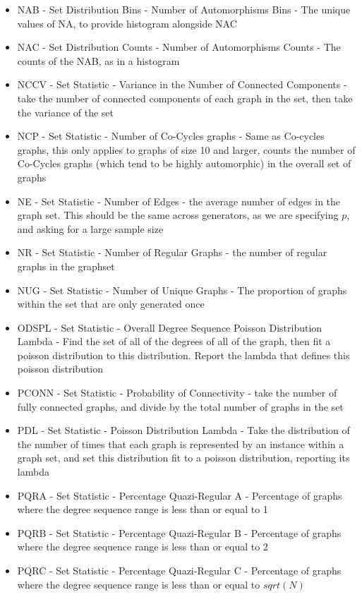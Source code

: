 \begin{itemize}
\item{NAB - Set Distribution Bins - Number of Automorphisms Bins - The unique values of NA, to provide histogram alongside NAC}
\item{NAC - Set Distribution Counts - Number of Automorphisms Counts - The counts of the NAB, as in a histogram}
\item{NCCV - Set Statistic - Variance in the Number of Connected Components - take the number of connected components of each graph in the set, then take the variance of the set}
\item{NCP - Set Statistic - Number of Co-Cycles graphs - Same as Co-cycles graphs, this only applies to graphs of size 10 and larger, counts the number of Co-Cycles graphs (which tend to be highly automorphic) in the overall set of graphs}
\item{NE - Set Statistic - Number of Edges - the average number of edges in the graph set. This should be the same across generators, as we are specifying $p$, and asking for a large sample size}
\item{NR - Set Statistic - Number of Regular Graphs - the number of regular graphs in the graphset}
\item{NUG - Set Statistic - Number of Unique Graphs - The proportion of graphs within the set that are only generated once}
\item{ODSPL - Set Statistic - Overall Degree Sequence Poisson Distribution Lambda  - Find the set of all of the degrees of all of the graph, then fit a poisson distribution to this distribution. Report the lambda that defines this poisson distribution}
\item{PCONN - Set Statistic - Probability of Connectivity - take the number of fully connected graphs, and divide by the total number of graphs in the set}
\item{PDL - Set Statistic - Poisson Distribution Lambda - Take the distribution of the number of times that each graph is represented by an instance within a graph set, and set this distribution fit to a poisson distribution, reporting its lambda}
\item{PQRA - Set Statistic - Percentage Quazi-Regular A - Percentage of graphs where the degree sequence range is less than or equal to 1}
\item{PQRB - Set Statistic - Percentage Quazi-Regular B - Percentage of graphs where the degree sequence range is less than or equal to 2}
\item{PQRC - Set Statistic - Percentage Quazi-Regular C - Percentage of graphs where the degree sequence range is less than or equal to $sqrt(N)$}

\end{itemize}
